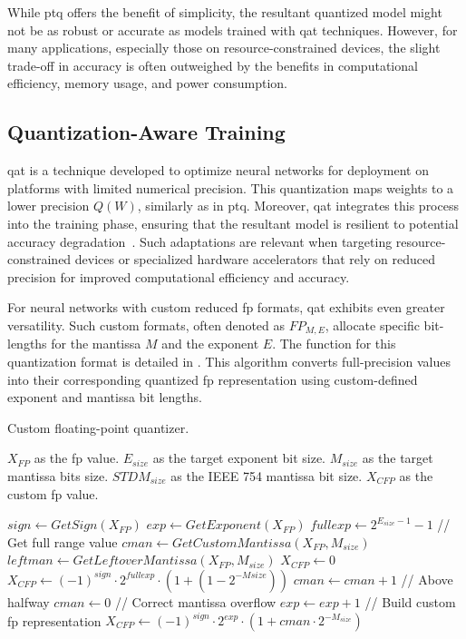 While \gls{ptq} offers the benefit of simplicity, the resultant quantized model might not be as robust or accurate as models trained with \gls{qat} techniques. However, for many applications, especially those on resource-constrained devices, the slight trade-off in accuracy is often outweighed by the benefits in computational efficiency, memory usage, and power consumption.


\subsection{Quantization-Aware Training}

\gls{qat} is a technique developed to optimize neural networks for deployment on platforms with limited numerical precision. This quantization maps weights to a lower precision \( Q(W) \), similarly as in \gls{ptq}. Moreover, \gls{qat} integrates this process into the training phase, ensuring that the resultant model is resilient to potential accuracy degradation~\cite{krishnamoorthi2018quantizing}. Such adaptations are relevant when targeting resource-constrained devices or specialized hardware accelerators that rely on reduced precision for improved computational efficiency and accuracy.

For neural networks with custom reduced \gls{fp} formats, \gls{qat} exhibits even greater versatility. Such custom formats, often denoted as \( FP_{M,E} \), allocate specific bit-lengths for the mantissa \( M \) and the exponent \( E \). The function for this quantization format is detailed in . This algorithm converts full-precision values into their corresponding quantized \gls{fp} representation using custom-defined exponent and mantissa bit lengths.

\begin{algorithm}[h!]
	\caption{Custom floating-point quantizer.}
	\label{alg:quantizr}
	\begin{algorithmic}
		\SetAlgoLined
		\renewcommand{\algorithmicrequire}{\textbf{input:}}
		\renewcommand{\algorithmicensure}{\textbf{output:}}
		\REQUIRE $X_{FP}$ as the \gls{fp} value.
		\REQUIRE $E_{size}$ as the target exponent bit size.
		\REQUIRE $M_{size}$ as the target mantissa bits size.
		\REQUIRE $STDM_{size}$ as the IEEE 754 mantissa bit size.
		\ENSURE $X_{CFP}$ as the custom \gls{fp} value.
		
		\STATE $sign \gets GetSign(X_{FP})$
		\STATE $exp \gets GetExponent(X_{FP})$
		\STATE $fullexp \gets 2^{E_{size}-1}-1$ // Get full range value
		\STATE $cman \gets GetCustomMantissa(X_{FP}, M_{size})$
		\STATE $leftman \gets GetLeftoverMantissa(X_{FP}, M_{size})$
		\STATE$X_{CFP}\gets0$
		\STATE$X_{CFP}\gets (-1)^{sign}\cdot2^{fullexp}\cdot(1+(1-2^{-M{size}}))$
		\ELSE
		\STATE $cman \gets cman+1$ // Above halfway
		\STATE $cman \gets 0$ // Correct mantissa overflow
		\STATE $exp \gets exp + 1$
		\ENDIF
		\ENDIF
		\STATE // Build custom \gls{fp} representation
		\STATE$X_{CFP}\gets (-1)^{sign}\cdot2^{exp}\cdot(1+cman\cdot2^{-M_{size}})$
		\ENDIF
	\end{algorithmic}
\end{algorithm}

